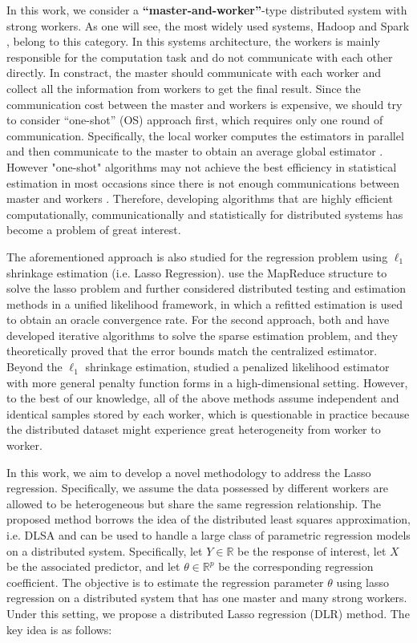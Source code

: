 \documentclass[11pt,en,authoryear]{elegantpaper}
\numberwithin{equation}{section}
\begin{document}
In this work, we consider a \textbf{“master-and-worker”}-type distributed system with strong workers. As one will see, the most widely used systems, Hadoop \citep{hadoop2011apache} and Spark \citep{spark2018apache}, belong to this category. In this systems architecture, the workers is mainly responsible for the computation task and do not communicate with each other directly. In constract, the master should communicate with each worker and collect all the information from workers to get the final result. Since the communication cost between the master and workers is expensive, we should try to consider “one-shot” (OS) approach first, which requires only one round of communication. Specifically, the local worker computes the estimators in parallel and then communicate to the master to obtain an average global estimator \citep{zhang2012communication,liu2014distributed,chang2017distributed,fan2019distributed}. However "one-shot" algorithms may not achieve the best efficiency in statistical estimation in most occasions since there is not enough communications between master and workers \citep{smith2018cocoa}. Therefore, developing algorithms that are highly efficient computationally, communicationally and statistically for distributed systems has become a problem of great interest.

The aforementioned approach is also studied for the regression problem using $\ell_1$ shrinkage estimation (i.e. Lasso Regression). 
\citep{battey2015distributed} use the MapReduce structure to solve the lasso problem and further considered distributed testing and estimation methods in a unified likelihood framework, in which a refitted estimation is used to obtain an oracle convergence rate. For the second approach, both \citep{wang2017efficient} and \citep{jordan2018communication} have developed iterative algorithms to solve the sparse estimation problem, and they theoretically proved that the error bounds match the centralized estimator. Beyond the $\ell_1$ shrinkage estimation, \citep{chen2014split} studied a penalized likelihood estimator with more general penalty function forms in a high-dimensional setting. However, to the best of our knowledge, all of the above methods assume independent and identical samples stored by each worker, which is questionable in practice because the distributed dataset might experience great heterogeneity from worker to worker.

In this work, we aim to develop a novel methodology to address the Lasso regression. Specifically, we assume the data possessed by different workers are allowed to be heterogeneous but share the same regression relationship. The proposed method borrows the idea of the distributed least squares approximation, i.e. DLSA \citep{zhu2019least} and can be used to handle a large class of parametric regression models on a distributed system. Specifically, let $Y \in \mathbb{R}$ be the response of interest, let $X$ be the associated predictor, and let $\theta \in \mathbb{R}^p$ be the corresponding regression coefficient. The objective is to estimate the regression parameter $\theta$ using lasso regression on a distributed system that has one master and many strong workers. Under this setting, we propose a distributed Lasso regression (DLR) method. The key idea is as follows:
\end{document}
